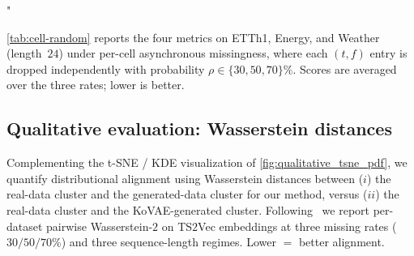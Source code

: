 "\documentclass{article}
\theoremstyle{plain}
\theoremstyle{definition}
\theoremstyle{remark}
\begin{document}
\cref{tab:cell-random} reports the four metrics on ETTh1, Energy, and Weather (length~$24$) under per-cell asynchronous missingness, where each $(t, f)$ entry is dropped independently with probability $\rho \in \{30, 50, 70\}\%$. Scores are averaged over the three rates; lower is better.

\begin{table}[!h]
\centering
\setlength{\tabcolsep}{6pt}
\caption{Per-cell missingness: scores averaged over $30/50/70\%$ rates on ETTh1, Energy, and Weather ($L{=}24$). Best per (metric, dataset) cell in bold.}
\label{tab:cell-random}
\end{table}

\subsection{Qualitative evaluation: Wasserstein distances}
\label{app:qualitative-wass}

Complementing the t-SNE / KDE visualization of \cref{fig:qualitative_tsne_pdf}, we quantify distributional alignment using Wasserstein distances between ($i$) the real-data cluster and the generated-data cluster for our method, versus ($ii$) the real-data cluster and the KoVAE-generated cluster. Following~\citet{fadlon2025imageni2r} we report per-dataset pairwise Wasserstein-$2$ on TS$2$Vec embeddings at three missing rates ($30/50/70\%$) and three sequence-length regimes. Lower $=$ better alignment.
\end{document}
